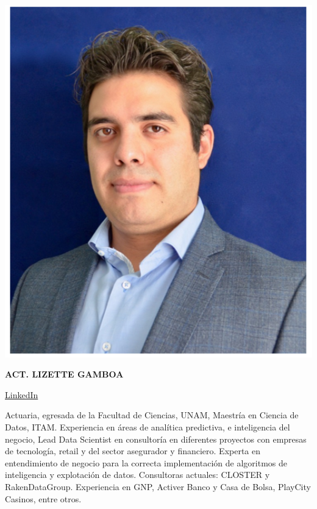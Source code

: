 \documentclass[
]{book}
\begin{document}
\begin{center}\includegraphics[width=6.57in]{img/arturo} \end{center}

\textbf{ACT. LIZETTE GAMBOA}

\href{https://www.linkedin.com/in/kalizzygam/}{LinkedIn}

Actuaria, egresada de la Facultad de Ciencias, UNAM, Maestría en Ciencia de Datos, ITAM.
Experiencia en áreas de analítica predictiva, e inteligencia del negocio, Lead Data Scientist en consultoría en diferentes proyectos con empresas de tecnología, retail y del sector asegurador y financiero. Experta en entendimiento de negocio para la correcta implementación de algoritmos de inteligencia y explotación de datos. Consultoras actuales: CLOSTER y RakenDataGroup. Experiencia en GNP, Activer Banco y Casa de Bolsa, PlayCity Casinos, entre otros.
\end{document}
